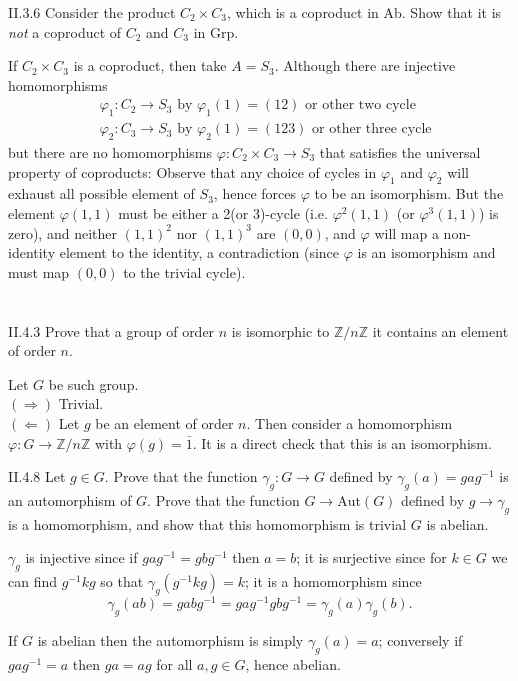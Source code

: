 \begin{problem}{II.3.6}
Consider the product $C_2 \times C_3$, which is a coproduct in \textsf{Ab}. Show that it is \textit{not} a coproduct of $C_2$ and $C_3$ in \textsf{Grp}.
\end{problem}
\begin{pf}
If $C_2 \times C_3$ is a coproduct, then take $A = S_3$. Although there are injective homomorphisms
\begin{align*}
&\varphi_1:C_2 \to S_3 \text{ by } \varphi_1(1) = (12) \text{ or other two cycle}\\
&\varphi_2:C_3 \to S_3 \text{ by } \varphi_2(1) = (123)\text{ or other three cycle} 
\end{align*}
but there are no homomorphisms $\varphi:C_2 \times C_3 \to S_3$ that satisfies the universal property of coproducts: Observe that any choice of cycles in $\varphi_1$ and $\varphi_2$ will exhaust all possible element of $S_3$, hence forces $\varphi$ to be an isomorphism. But the element $\varphi(1,1)$ must be either a 2(or 3)-cycle (i.e. $\varphi^2(1,1)$ (or $\varphi^3(1,1)$) is zero), and neither $(1,1)^2$ nor $(1,1)^3$ are $(0,0)$, and $\varphi$ will map a non-identity element to the identity, a contradiction (since $\varphi$ is an isomorphism and must map $(0,0)$ to the trivial cycle).
\end{pf}

\section{}

\begin{problem}{II.4.3}
Prove that a group of order $n$ is isomorphic to $\mathbb{Z}/n\mathbb{Z}$ \iffw it contains an element of order $n$.
\end{problem}
\begin{pf}
Let $G$ be such group. \\
$(\Rightarrow)$ Trivial. \\
$(\Leftarrow)$ Let $g$ be an element of order $n$. Then consider a homomorphism $\varphi: G \to \mathbb{Z}/n\mathbb{Z}$ with $\varphi(g) = \bar{1}$. It is a direct check that this is an isomorphism.
\end{pf}

\begin{problem}{II.4.8}
Let $g \in G$. Prove that the function $\gamma_g:G \to G$ defined by $\gamma_g(a)=gag^{-1}$ is an automorphism of $G$. Prove that the function $G \to \text{Aut}(G)$ defined by $g \to \gamma_g$ is a homomorphism, and show that this homomorphism is trivial \iffw $G$ is abelian.
\end{problem}
\begin{pf}
$\gamma_g$ is injective since if $gag^{-1} = gbg^{-1}$ then $a = b$; it is surjective since for $k \in G$ we can find $g^{-1}kg$ so that $\gamma_g(g^{-1}kg) = k$; it is a homomorphism since \[\gamma_g(ab) = gabg^{-1} = gag^{-1}gbg^{-1} = \gamma_g(a)\gamma_g(b).\]

If $G$ is abelian then the automorphism is simply $\gamma_g(a)=a$; conversely if $gag^{-1} = a$ then $ga = ag$ for all $a, g \in G$, hence abelian.
\end{pf}

